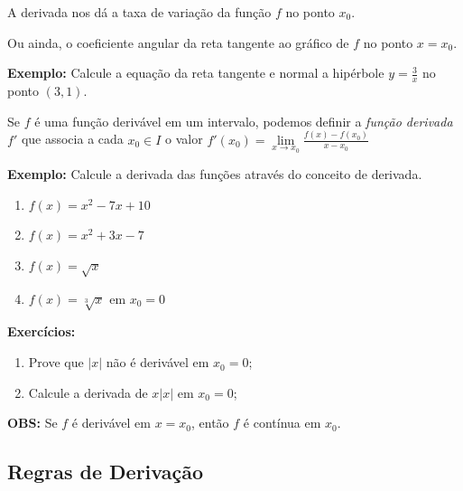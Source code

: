 \documentclass[oneside,a4paper,12pt]{article}
\begin{document}
A derivada nos dá a taxa de variação da função $f$ no ponto $x_0$.

Ou ainda, o coeficiente angular da reta tangente ao gráfico de $f$ no ponto $x=x_0$.

\newpage

{\bf Exemplo:} Calcule a equação da reta tangente e normal a hipérbole $y=\frac{3}{x}$ no ponto $(3,1)$.

\newpage

Se $f$ é uma função derivável em um intervalo, podemos definir a \emph{função derivada} $f'$ que associa a cada $x_0 \in I$ o valor $f'(x_0) = \lim\limits_{x \rightarrow x_0}\frac{f(x) - f(x_0)}{x-x_0}$

{\bf Exemplo:} Calcule a derivada das funções através do conceito de derivada.
\begin{enumerate}
	\item $f(x) = x^2 - 7x + 10$
	\item $f(x) = x^2 + 3x - 7$
	\item $f(x) = \sqrt{x}$
	\item $f(x) = \sqrt[3]{x}$ em $x_0 = 0$
\end{enumerate}
{\bf Exercícios:} 
\begin{enumerate}
	\item Prove que $|x|$ não é derivável em $x_0=0$;
	\item Calcule a derivada de $x|x|$ em $x_0 = 0$;
\end{enumerate}
\newpage

{\bf OBS:} Se $f$ é derivável em $x=x_0$, então $f$ é contínua em $x_0$.

\vspace{230pt}
\subsection{Regras de Derivação}
\end{document}
